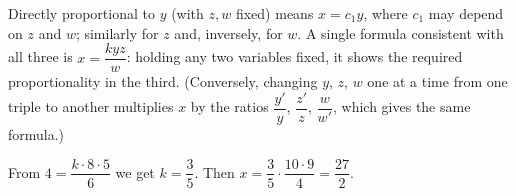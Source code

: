 Directly proportional to $y$ (with $z,w$ fixed) means $x=c_1y$, where $c_1$ may depend on $z$ and $w$; similarly for $z$ and, inversely, for $w$. A single formula consistent with all three is $x=\dfrac{kyz}{w}$: holding any two variables fixed, it shows the required proportionality in the third. (Conversely, changing $y$, $z$, $w$ one at a time from one triple to another multiplies $x$ by the ratios $\dfrac{y'}{y}$, $\dfrac{z'}{z}$, $\dfrac{w}{w'}$, which gives the same formula.)

From $4=\dfrac{k\cdot8\cdot5}{6}$ we get $k=\dfrac{3}{5}$. Then $x=\dfrac{3}{5}\cdot\dfrac{10\cdot9}{4}=\boxed{\dfrac{27}{2}}$.
